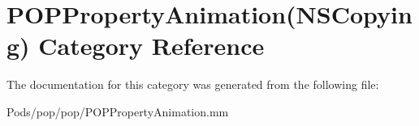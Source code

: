 \hypertarget{category_p_o_p_property_animation_07_n_s_copying_08}{}\section{P\+O\+P\+Property\+Animation(N\+S\+Copying) Category Reference}
\label{category_p_o_p_property_animation_07_n_s_copying_08}


The documentation for this category was generated from the following file\+:\begin{DoxyCompactItemize}
\item 
Pods/pop/pop/P\+O\+P\+Property\+Animation.\+mm\end{DoxyCompactItemize}
